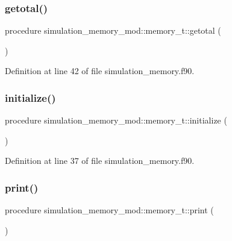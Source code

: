 \subsubsection{\texorpdfstring{getotal()}{getotal()}}
{\footnotesize\ttfamily procedure simulation\+\_\+memory\+\_\+mod\+::memory\+\_\+t\+::getotal (\begin{DoxyParamCaption}{ }\end{DoxyParamCaption})\hspace{0.3cm}{\ttfamily [private]}}



Definition at line 42 of file simulation\+\_\+memory.\+f90.

\mbox{\label{structsimulation__memory__mod_1_1memory__t_aba98543cee9846320a3cb7b522d32525}} 
\subsubsection{\texorpdfstring{initialize()}{initialize()}}
{\footnotesize\ttfamily procedure simulation\+\_\+memory\+\_\+mod\+::memory\+\_\+t\+::initialize (\begin{DoxyParamCaption}{ }\end{DoxyParamCaption})\hspace{0.3cm}{\ttfamily [private]}}



Definition at line 37 of file simulation\+\_\+memory.\+f90.

\mbox{\label{structsimulation__memory__mod_1_1memory__t_a12a39d94e7e4e9b857d0a5613dd01996}} 
\subsubsection{\texorpdfstring{print()}{print()}}
{\footnotesize\ttfamily procedure simulation\+\_\+memory\+\_\+mod\+::memory\+\_\+t\+::print (\begin{DoxyParamCaption}{ }\end{DoxyParamCaption})\hspace{0.3cm}{\ttfamily [private]}}



